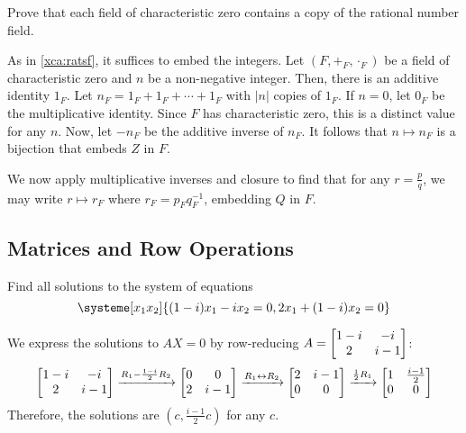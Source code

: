 \documentclass{agony}
\begin{document}
\begin{xca}
  Prove that each field of characteristic zero contains a copy of the rational number field.
\end{xca}
\begin{prf}
  As in \cref{xca:ratsf}, it suffices to embed the integers.
  Let $(F, +_F, \cdot_F)$ be a field of characteristic zero and $n$ be a non-negative integer.
  Then, there is an additive identity $1_F$.
  Let $n_F = 1_F + 1_F + \dotsb + 1_F$ with $|n|$ copies of $1_F$.
  If $n = 0$, let $0_F$ be the multiplicative identity.
  Since $F$ has characteristic zero, this is a distinct value for any $n$.
  Now, let $-n_F$ be the additive inverse of $n_F$.
  It follows that $n \mapsto n_F$ is a bijection that embeds $Z$ in $F$.

  We now apply multiplicative inverses and closure to find that for any $r = \frac{p}{q}$,
  we may write $r \mapsto r_F$ where $r_F = p_F q_F^{-1}$, embedding $Q$ in $F$.
\end{prf}

\subsection{Matrices and Row Operations}

\begin{xca}
  Find all solutions to the system of equations
  \[ \systeme[x_1x_2]{{(1-i)}x_1 - ix_2 = 0, 2x_1 + {(1-i)}x_2 = 0} \]
\end{xca}
\begin{sol}
  We express the solutions to $AX = 0$ by row-reducing $A = \mqty[1-i&-i\\2&i-1]$:
  \[
    \mqty[1-i&-i\\2&i-1]
    \xto{R_1 - \frac{1-i}{2}R_2} \mqty[0&0\\2&i-1]
    \xto{R_1 \harr R_2} \mqty[2&i-1\\0&0]
    \xto{\frac12 R_1} \mqty[1&\frac{i-1}{2}\\0&0]
  \]
  Therefore, the solutions are $(c, \frac{i-1}{2}c)$ for any $c$.
\end{sol}
\end{document}
